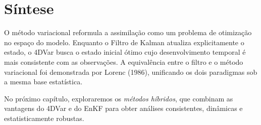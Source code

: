 \section{Síntese}
O método variacional reformula a assimilação como um problema de otimização no espaço do modelo.  
Enquanto o Filtro de Kalman atualiza explicitamente o estado, o 4DVar busca o estado inicial ótimo cujo desenvolvimento temporal é mais consistente com as observações.  
A equivalência entre o filtro e o método variacional foi demonstrada por Lorenc (1986), unificando os dois paradigmas sob a mesma base estatística.

No próximo capítulo, exploraremos os \emph{métodos híbridos}, que combinam as vantagens do 4DVar e do EnKF para obter análises consistentes, dinâmicas e estatisticamente robustas.

